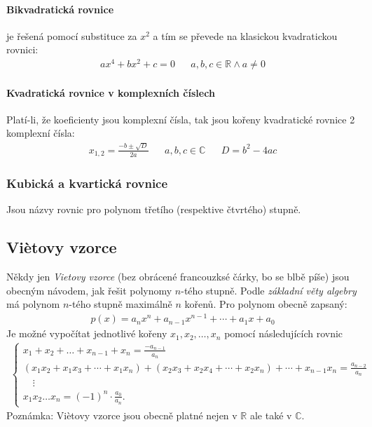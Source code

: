 \documentclass[12pt]{article}
\newcommand{\nR}{\mathbb{R}} %
\newcommand{\nC}{\mathbb{C}} %
\begin{document}
\paragraph{Bikvadratická rovnice} je řešená pomocí substituce za $x^2$ a tím se převede na klasickou kvadratickou rovnici:
\begin{align}
ax^4 + bx^2 + c =0 && a,b,c \in \nR \land a \neq 0
\end{align}
\paragraph{Kvadratická rovnice v komplexních číslech}
Platí-li, že koeficienty jsou komplexní čísla, tak jsou kořeny kvadratické rovnice 2 komplexní čísla:
\begin{align}
x_{{1,2}}= \frac  {-b\pm {\sqrt  {D}}}{2a} && a,b,c \in \nC && D=b^{2}-4ac 
\end{align}

\subsubsection{Kubická a kvartická rovnice}
Jsou názvy rovnic pro polynom třetího (respektive čtvrtého) stupně.
\subsection{Viètovy vzorce}
\label{sec:vietovy_vzorce}
Někdy jen \emph{Vietovy vzorce} (bez obrácené francouzksé čárky, bo se blbě píše) jsou obecným návodem, jak řešit polynomy $n$-tého stupně. Podle \emph{základní věty algebry} má polynom $n$-tého stupně maximálně $n$ kořenů. Pro polynom obecně zapsaný:
\begin{align}
p(x)=a_{n}x^{n}+a_{n-1}x^{n-1}+\cdots +a_{1}x+a_{0}
\end{align}
Je možné vypočítat jednotlivé kořeny $x_1, x_2, \dotsc , x_n$ pomocí následujících rovnic
\begin{align}
\begin{cases}
x_{1}+x_{2}+\dots +x_{n-1}+x_{n}={\tfrac {-a_{n-1}}{a_{n}}}\\(x_{1}x_{2}+x_{1}x_{3}+\cdots +x_{1}x_{n})+(x_{2}x_{3}+x_{2}x_{4}+\cdots +x_{2}x_{n})+\cdots +x_{n-1}x_{n}={\frac {a_{n-2}}{a_{n}}}\\
{}\quad \vdots \\x_{1}x_{2}\dots x_{n}=(-1)^{n} \cdot{\tfrac {a_{0}}{a_{n}}}.\end{cases}
\end{align}
Poznámka: Viètovy vzorce jsou obecně platné nejen v $\nR$ ale také v $\nC$.
\end{document}
